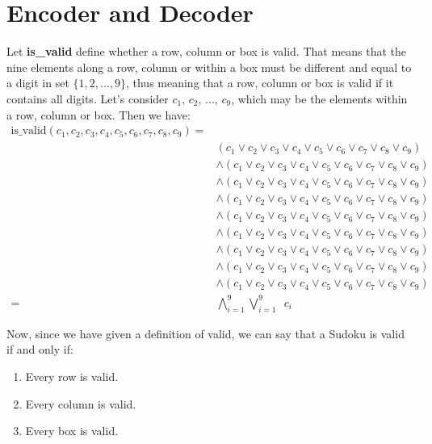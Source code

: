 \documentclass[]{usiinfprospectus}
\newcounter{row}
\newcounter{col}
\begin{document}
\section{Encoder and Decoder}\label{encdec}
\noindent
Let \textbf{is\_valid} define whether a row, column or box is valid. That means that the nine elements along a row, column or within a box must be different and equal to a digit in set $\{1,2,...,9\}$, thus meaning that a row, column or box is valid if it contains all digits. Let's consider $c_1,\,c_2,\,...,\,c_9$, which may be the elements within a row, column or box. Then we have:
\begin{align*}
\text{is\_valid}\left(  c_1,  c_2,  c_3,  c_4,  c_5,  c_6,  c_7,  c_8,  c_9  \right) = & \\
& \left(  c_1 \vee  c_2 \vee c_3 \vee c_4 \vee  c_5 \vee  c_6 \vee  c_7 \vee  c_8 \vee  c_9  \right)\\
& \wedge \left(  c_1 \vee  c_2 \vee c_3 \vee c_4 \vee  c_5 \vee  c_6 \vee  c_7 \vee  c_8 \vee  c_9  \right)\\
& \wedge \left(  c_1 \vee  c_2 \vee c_3 \vee c_4 \vee  c_5 \vee  c_6 \vee  c_7 \vee  c_8 \vee  c_9  \right)\\
& \wedge \left(  c_1 \vee  c_2 \vee c_3 \vee c_4 \vee  c_5 \vee  c_6 \vee  c_7 \vee  c_8 \vee  c_9  \right)\\
& \wedge \left(  c_1 \vee  c_2 \vee c_3 \vee c_4 \vee  c_5 \vee  c_6 \vee  c_7 \vee  c_8 \vee  c_9  \right)\\
& \wedge \left(  c_1 \vee  c_2 \vee c_3 \vee c_4 \vee  c_5 \vee  c_6 \vee  c_7 \vee  c_8 \vee  c_9  \right)\\
& \wedge \left(  c_1 \vee  c_2 \vee c_3 \vee c_4 \vee  c_5 \vee  c_6 \vee  c_7 \vee  c_8 \vee  c_9  \right)\\
& \wedge \left(  c_1 \vee  c_2 \vee c_3 \vee c_4 \vee  c_5 \vee  c_6 \vee  c_7 \vee  c_8 \vee  c_9  \right)\\
& \wedge \left(  c_1 \vee  c_2 \vee c_3 \vee c_4 \vee  c_5 \vee  c_6 \vee  c_7 \vee  c_8 \vee  c_9  \right)\\
= & \bigwedge^9_{i=1}  \bigvee^9_{i=1} \,\,\, c_i
\end{align*}

\noindent
Now, since we have given a definition of valid, we can say that a Sudoku is valid if and only if: 
\begin{enumerate}[label={(\arabic*)}]
\item Every row is valid.
\item Every column is valid.
\item Every box is valid.
\end{enumerate}
\end{document}
